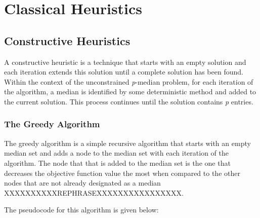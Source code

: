 \documentclass[11pt]{article}
\begin{document}
	\section{Classical Heuristics}
	\subsection{Constructive Heuristics}
	A constructive heuristic is a technique that starts with an empty solution and each iteration extends this solution until a complete solution has been found.  Within the context of the unconstrained \emph{p}-median problem, for each iteration of the algorithm, a median is identified by some deterministic method and added to the current solution.  This process continues until the solution contains \emph{p} entries.
	
	\subsubsection{The Greedy Algorithm}
	The greedy algorithm  is a simple recursive algorithm that starts with an empty median set and adds a node to the median set with each iteration of the algorithm.  The node that that is added to the median set is the one that decreases the objective function value the most when compared to the other nodes that are not already designated as a median XXXXXXXXXXREPHRASEXXXXXXXXXXXXXXXX.
	
	The pseudocode  for this algorithm is given below:
\end{document}
